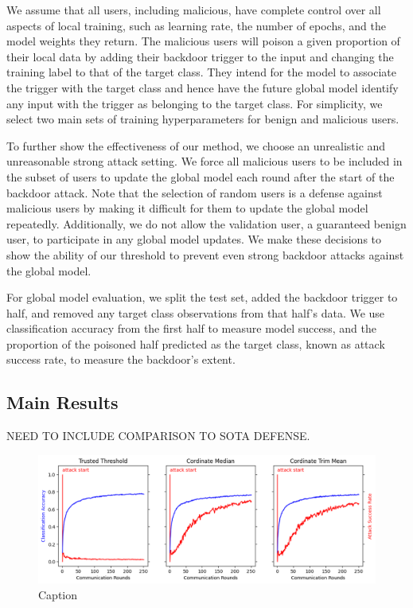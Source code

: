 \documentclass{article} %
\begin{document}
We assume that all users, including malicious, have complete control over all aspects of local training, such as learning rate, the number of epochs, and the model weights they return. The malicious users will poison a given proportion of their local data by adding their backdoor trigger to the input and changing the training label to that of the target class. They intend for the model to associate the trigger with the target class and hence have the future global model identify any input with the trigger as belonging to the target class. For simplicity, we select two main sets of training hyperparameters for benign and malicious users. 

To further show the effectiveness of our method, we choose an unrealistic and unreasonable strong attack setting. We force all malicious users to be included in the subset of users to update the global model each round after the start of the backdoor attack. Note that the selection of random users is a defense against malicious users by making it difficult for them to update the global model repeatedly. Additionally, we do not allow the validation user, a guaranteed benign user, to participate in any global model updates. We make these decisions to show the ability of our threshold to prevent even strong backdoor attacks against the global model. 

For global model evaluation, we split the test set, added the backdoor trigger to half, and removed any target class observations from that half's data. We use classification accuracy from the first half to measure model success, and the proportion of the poisoned half predicted as the target class, known as attack success rate, to measure the backdoor's extent.


%
\subsection{Main Results}

NEED TO INCLUDE COMPARISON TO SOTA DEFENSE.
\begin{figure}[H]
    \centering
    \includegraphics[width=.75\textwidth]{01_trusted/centralized/alpha10000--alpha_val10000/visuals/baseline--n_malicious1.png}
    \caption{Caption}
    \label{fig:my_label}
\end{figure}
\end{document}
